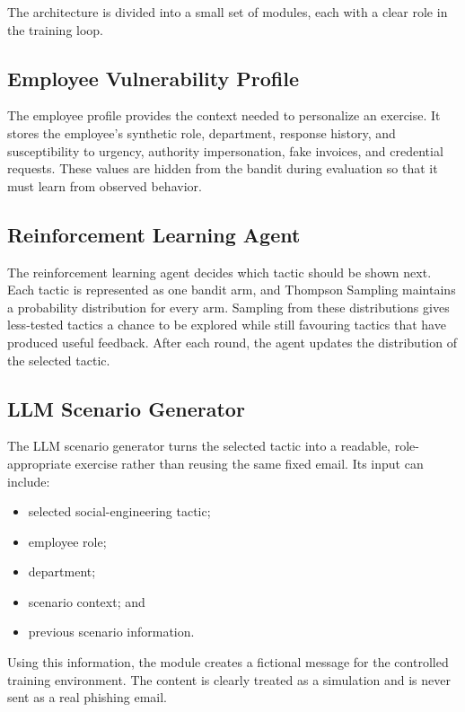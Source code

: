 \documentclass[12pt,a4paper]{article}
\begin{document}
The architecture is divided into a small set of modules, each with a
clear role in the training loop.

\subsection{Employee Vulnerability Profile}

The employee profile provides the context needed to personalize an
exercise. It stores the employee's synthetic role, department, response
history, and susceptibility to urgency, authority impersonation, fake
invoices, and credential requests. These values are hidden from the
bandit during evaluation so that it must learn from observed behavior.

\subsection{Reinforcement Learning Agent}

The reinforcement learning agent decides which tactic should be shown
next. Each tactic is represented as one bandit arm, and Thompson
Sampling maintains a probability distribution for every arm. Sampling
from these distributions gives less-tested tactics a chance to be
explored while still favouring tactics that have produced useful
feedback. After each round, the agent updates the distribution of the
selected tactic.

\subsection{LLM Scenario Generator}

The LLM scenario generator turns the selected tactic into a readable,
role-appropriate exercise rather than reusing the same fixed email. Its
input can include:

\begin{itemize}
    \item selected social-engineering tactic;
    \item employee role;
    \item department;
    \item scenario context; and
    \item previous scenario information.
\end{itemize}

Using this information, the module creates a fictional message for the
controlled training environment. The content is clearly treated as a
simulation and is never sent as a real phishing email.
\end{document}
